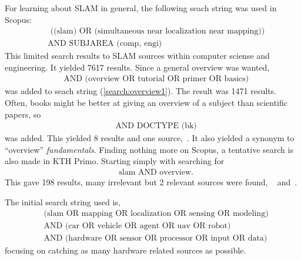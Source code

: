 For learning about SLAM in general, the following seach string was used in Scopus:
\begin{align}
    \label{search:overview1}
    &\text{ ((slam) OR (simultaneous near localization near mapping))}\nonumber \\
    &\text{AND SUBJAREA (comp, engi)}
\end{align}
This limited search results to SLAM sources within computer sciense and
engineering. It yielded 7617 results. Since a general overview was wanted, 
\begin{align}
    \label{search:overview2}
    &\text{AND (overview OR tutorial OR primer OR basics)}
\end{align}
was added to seach string (\ref{search:overview1}). The result was 1471 results.
Often, books might be better at giving an overview of a subject than scientific
papers, so
\begin{align}
    \label{search:overview3}
    &\text{AND DOCTYPE (bk)}
\end{align}
was added. This yielded 8 results and one source,~\cite{Kernbach20131}. It also
yielded a synonym to ``overview'' \textit{fundamentals}. 
Finding nothing more on Scopus, a tentative search is also made in KTH Primo.
Starting  simply with searching for
\begin{align}
    \label{search:overview4}
    &\text{slam AND overview}.
\end{align}
This gave 198 results, many irrelevant but 2 relevant sources were found,
~\cite{Frese2010} and~\cite{5769022}.

The initial search string used is,
\begin{align}
    &\text{(slam OR mapping OR localization OR sensing OR modeling)} \nonumber \\ 
    &\text{AND (car OR vehicle OR agent OR uav OR robot)} \\
    &\text{AND (hardware OR sensor OR processor OR input OR data)} \nonumber
\end{align}
focusing on catching as many hardware related sources as possible.  
